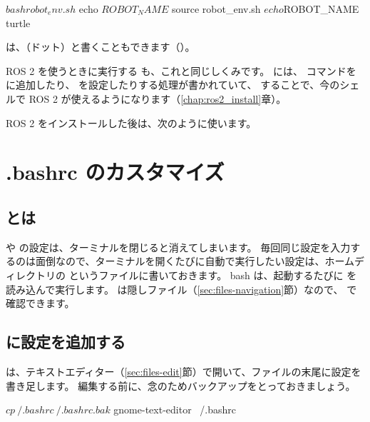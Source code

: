 \begin{terminal}
$ bash robot_env.sh
$ echo $ROBOT_NAME

$ source robot_env.sh
$ echo $ROBOT_NAME
turtle
\end{terminal}

 は、（ドット）と書くこともできます（）。

ROS 2 を使うときに実行する  も、これと同じしくみです。
 には、 コマンドを  に追加したり、 を設定したりする処理が書かれていて、 することで、今のシェルで ROS 2 が使えるようになります（\ref{chap:ros2_install}章）。

ROS 2 をインストールした後は、次のように使います。


\section{.bashrc のカスタマイズ}
\label{sec:env-bashrc}

\subsection{ とは}

 や  の設定は、ターミナルを閉じると消えてしまいます。
毎回同じ設定を入力するのは面倒なので、ターミナルを開くたびに自動で実行したい設定は、ホームディレクトリの  というファイルに書いておきます。
bash は、起動するたびに  を読み込んで実行します。
 は隠しファイル（\ref{sec:files-navigation}節）なので、 で確認できます。

\subsection{ に設定を追加する}

 は、テキストエディター（\ref{sec:files-edit}節）で開いて、ファイルの末尾に設定を書き足します。
編集する前に、念のためバックアップをとっておきましょう。

\begin{terminal}
$ cp ~/.bashrc ~/.bashrc.bak
$ gnome-text-editor ~/.bashrc
\end{terminal}

